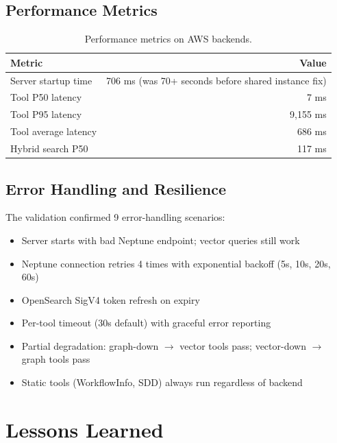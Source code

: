 \documentclass[11pt,letterpaper]{article}
\begin{document}
\subsection{Performance Metrics}

\begin{table}[H]
\centering
\footnotesize
\begin{tabular}{@{}lr@{}}
\toprule
\textbf{Metric} & \textbf{Value} \\
\midrule
Server startup time & 706 ms (was 70+ seconds before shared instance fix) \\
Tool P50 latency & 7 ms \\
Tool P95 latency & 9,155 ms \\
Tool average latency & 686 ms \\
Hybrid search P50 & 117 ms \\
\bottomrule
\end{tabular}
\caption{Performance metrics on AWS backends.}
\label{tab:performance}
\end{table}

\subsection{Error Handling and Resilience}

The validation confirmed 9 error-handling scenarios:

\begin{itemize}[noitemsep]
    \item Server starts with bad Neptune endpoint; vector queries still work
    \item Neptune connection retries 4 times with exponential backoff
          (5s, 10s, 20s, 60s)
    \item OpenSearch SigV4 token refresh on expiry
    \item Per-tool timeout (30s default) with graceful error reporting
    \item Partial degradation: graph-down $\rightarrow$ vector tools pass;
          vector-down $\rightarrow$ graph tools pass
    \item Static tools (WorkflowInfo, SDD) always run regardless of backend
\end{itemize}

\section{Lessons Learned}
\label{sec:lessons}
\end{document}
